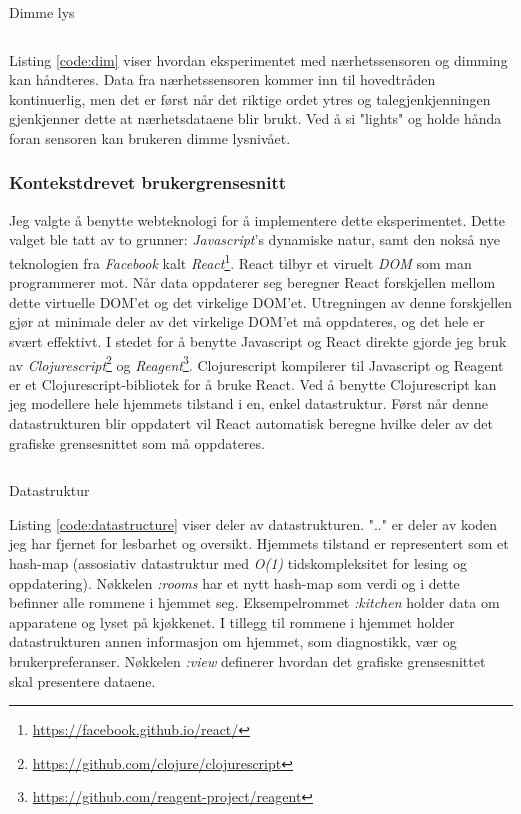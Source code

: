 \begin{listing}[ht]
\caption{Dimme lys}
\inputminted[fontsize=\footnotesize, linenos]{python}{kodesnutter/dimming.py}
\label{code:dim}
\end{listing}
Listing \ref{code:dim} viser hvordan eksperimentet med nærhetssensoren og dimming kan håndteres. Data fra nærhetssensoren kommer inn til hovedtråden kontinuerlig, men det er først når det riktige ordet ytres og talegjenkjenningen gjenkjenner dette at nærhetsdataene blir brukt. Ved å si "lights" og holde hånda foran sensoren kan brukeren dimme lysnivået.

\subsubsection{Kontekstdrevet brukergrensesnitt}
Jeg valgte å benytte webteknologi for å implementere dette eksperimentet. Dette valget ble tatt av to grunner: \emph{Javascript}'s dynamiske natur, samt den nokså nye teknologien fra \emph{Facebook} kalt \emph{React}\footnote{\url{https://facebook.github.io/react/}}. React tilbyr et viruelt \emph{DOM} som man programmerer mot. Når data oppdaterer seg beregner React forskjellen mellom dette virtuelle DOM'et og det virkelige DOM'et. Utregningen av denne forskjellen gjør at minimale deler av det virkelige DOM'et må oppdateres, og det hele er svært effektivt. I stedet for å benytte Javascript og React direkte gjorde jeg bruk av \emph{Clojurescript}\footnote{\url{https://github.com/clojure/clojurescript}} og \emph{Reagent}\footnote{\url{https://github.com/reagent-project/reagent}}. Clojurescript kompilerer til Javascript og Reagent er et Clojurescript-bibliotek for å bruke React. Ved å benytte Clojurescript kan jeg modellere hele hjemmets tilstand i en, enkel datastruktur. Først når denne datastrukturen blir oppdatert vil React automatisk beregne hvilke deler av det grafiske grensesnittet som må oppdateres.
\begin{listing}[ht]
\label{code:datastructure}
\inputminted[fontsize=\footnotesize, linenos]{clj}{kodesnutter/data.clj}
\caption{Datastruktur}
\end{listing}
Listing \ref{code:datastructure} viser deler av datastrukturen. ".." er deler av koden jeg har fjernet for lesbarhet og oversikt. Hjemmets tilstand er representert som et hash-map (assosiativ datastruktur med \emph{O(1)} tidskompleksitet for lesing og oppdatering). Nøkkelen \emph{:rooms} har et nytt hash-map som verdi og i dette befinner alle rommene i hjemmet seg. Eksempelrommet \emph{:kitchen} holder data om apparatene og lyset på kjøkkenet. I tillegg til rommene i hjemmet holder datastrukturen annen informasjon om hjemmet, som diagnostikk, vær og brukerpreferanser. Nøkkelen \emph{:view} definerer hvordan det grafiske grensesnittet skal presentere dataene.  
